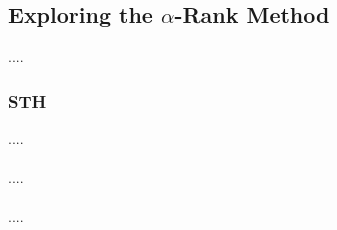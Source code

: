 \subsection{Exploring the \texorpdfstring{$\alpha$}{alpha}-Rank Method}

\begin{flushleft}
    ....
\end{flushleft}

\subsubsection{STH}

\begin{flushleft}
    ....\\~\\

    ....\\~\\
    
    ....\\~\\
\end{flushleft}